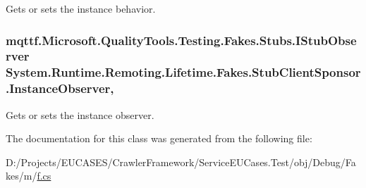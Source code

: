 Gets or sets the instance behavior.

\hypertarget{class_system_1_1_runtime_1_1_remoting_1_1_lifetime_1_1_fakes_1_1_stub_client_sponsor_aa46e8af4f2f56273e0d317f820ed9237}{
\subsubsection[{Instance\-Observer}]{\setlength{\rightskip}{0pt plus 5cm}mqttf.\-Microsoft.\-Quality\-Tools.\-Testing.\-Fakes.\-Stubs.\-I\-Stub\-Observer System.\-Runtime.\-Remoting.\-Lifetime.\-Fakes.\-Stub\-Client\-Sponsor.\-Instance\-Observer\hspace{0.3cm}{\ttfamily [get]}, {\ttfamily [set]}}}\label{class_system_1_1_runtime_1_1_remoting_1_1_lifetime_1_1_fakes_1_1_stub_client_sponsor_aa46e8af4f2f56273e0d317f820ed9237}


Gets or sets the instance observer.



The documentation for this class was generated from the following file\-:\begin{DoxyCompactItemize}
\item 
D\-:/\-Projects/\-E\-U\-C\-A\-S\-E\-S/\-Crawler\-Framework/\-Service\-E\-U\-Cases.\-Test/obj/\-Debug/\-Fakes/m/\hyperlink{m_2f_8cs}{f.\-cs}\end{DoxyCompactItemize}

